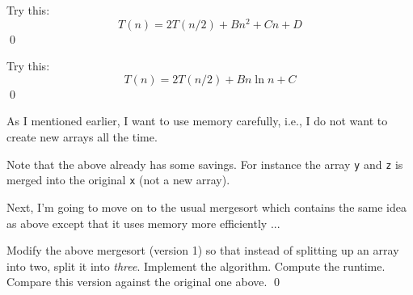 \begin{ex}
Try this:
\[
T(n) = 2T(n/2) + Bn^2 + Cn + D
\]
\qed
\end{ex}

\begin{ex}
Try this:
\[
T(n) = 2T(n/2) + Bn \ln n + C
\]
\qed
\end{ex}


As I mentioned earlier, I want to use memory carefully, i.e., 
I do not want to create new arrays all the time.

Note that the above already has some savings.
For instance the array \verb!y! and \verb!z! is merged into
the original \verb!x! (not a new array).

Next, I'm going to move on to the usual mergesort which
contains the same idea as above except that it uses memory
more efficiently ...


\begin{ex}
Modify the above mergesort (version 1)
so that instead of splitting up an array into two, split it into \textit{three}.
Implement the algorithm. 
Compute the runtime.
Compare this version against the original one above.
\qed
\end{ex}

